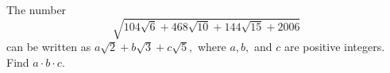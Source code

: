 The number \[ \sqrt{104\sqrt{6}+468\sqrt{10}+144\sqrt{15}+2006} \] can be written as $a\sqrt{2}+b\sqrt{3}+c\sqrt{5},$ where $a, b,$ and $c$ are positive integers.  Find $a\cdot b\cdot c$.